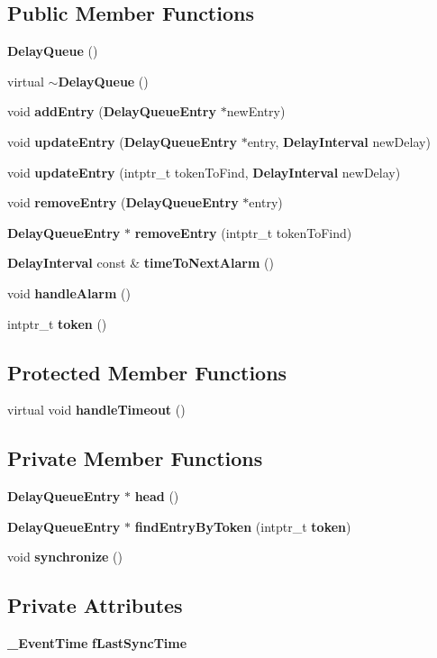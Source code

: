 \subsection*{Public Member Functions}
\begin{DoxyCompactItemize}
\item 
{\bf Delay\+Queue} ()
\item 
virtual {\bf $\sim$\+Delay\+Queue} ()
\item 
void {\bf add\+Entry} ({\bf Delay\+Queue\+Entry} $\ast$new\+Entry)
\item 
void {\bf update\+Entry} ({\bf Delay\+Queue\+Entry} $\ast$entry, {\bf Delay\+Interval} new\+Delay)
\item 
void {\bf update\+Entry} (intptr\+\_\+t token\+To\+Find, {\bf Delay\+Interval} new\+Delay)
\item 
void {\bf remove\+Entry} ({\bf Delay\+Queue\+Entry} $\ast$entry)
\item 
{\bf Delay\+Queue\+Entry} $\ast$ {\bf remove\+Entry} (intptr\+\_\+t token\+To\+Find)
\item 
{\bf Delay\+Interval} const \& {\bf time\+To\+Next\+Alarm} ()
\item 
void {\bf handle\+Alarm} ()
\item 
intptr\+\_\+t {\bf token} ()
\end{DoxyCompactItemize}
\subsection*{Protected Member Functions}
\begin{DoxyCompactItemize}
\item 
virtual void {\bf handle\+Timeout} ()
\end{DoxyCompactItemize}
\subsection*{Private Member Functions}
\begin{DoxyCompactItemize}
\item 
{\bf Delay\+Queue\+Entry} $\ast$ {\bf head} ()
\item 
{\bf Delay\+Queue\+Entry} $\ast$ {\bf find\+Entry\+By\+Token} (intptr\+\_\+t {\bf token})
\item 
void {\bf synchronize} ()
\end{DoxyCompactItemize}
\subsection*{Private Attributes}
\begin{DoxyCompactItemize}
\item 
{\bf \+\_\+\+Event\+Time} {\bf f\+Last\+Sync\+Time}
\end{DoxyCompactItemize}


